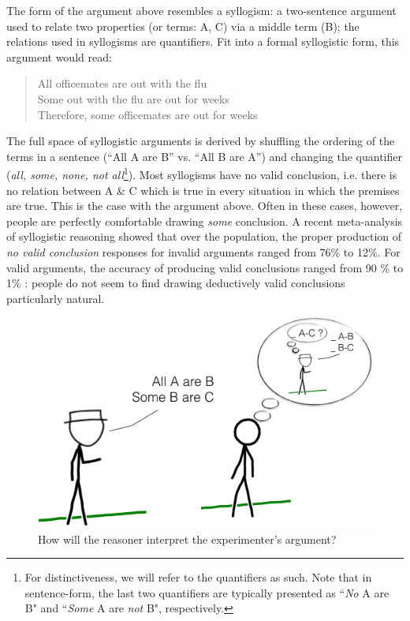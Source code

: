 \documentclass[10pt,letterpaper]{article}
\begin{document}
The form of the argument above resembles a syllogism: a two-sentence argument used to relate two properties (or terms: A, C) via a middle term (B); the relations used in syllogisms are quantifiers. Fit into a formal syllogistic form, this argument would read:
\begin{quote}
All officemates are out with the flu\\
Some out with the flu are out for weeks\\
Therefore, some officemates are out for weeks
\end{quote}
The full space of syllogistic arguments is derived by shuffling the ordering of the terms in a sentence (``All A are B'' vs. ``All B are A'') and changing the quantifier (\emph{all, some, none, not all}\footnote{For distinctiveness, we will refer to the quantifiers as such. Note that in sentence-form, the last two quantifiers are typically presented as ``\emph{No} A are B" and ``\emph{Some} A are \emph{not} B", respectively.}). Most syllogisms have no valid conclusion, i.e. there is no relation between A \& C which is true in every situation in which the premises are true. This is the case with the argument above. Often in these cases, however, people are perfectly comfortable drawing \emph{some} conclusion. A recent meta-analysis of syllogistic reasoning showed that over the population, the proper production of \emph{no valid conclusion} responses for invalid arguments ranged from 76\% to 12\%. For valid arguments, the accuracy of producing valid conclusions ranged from 90 \% to 1\% \cite{Khemlani2012}: people do not seem to find drawing deductively valid conclusions particularly natural.
%
\begin{figure}
\centering
    \includegraphics[width=\columnwidth]{fig0_cartoon3}
    \caption{How will the reasoner interpret the experimenter's argument?}
  \label{fig:xkcd}
\end{figure}
\end{document}
